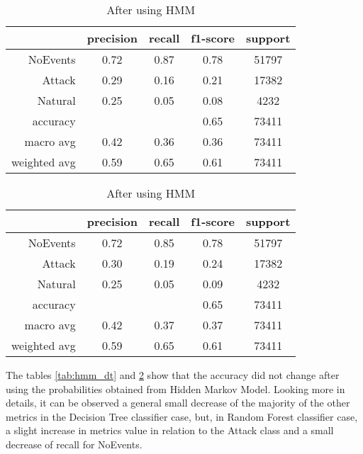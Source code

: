 \begin{table}[H]
    \centering \footnotesize
    \caption{Hidden Markov Model manipulation results for Random Forest classifier}  \label{tab:hmm_rf}
    \begin{subtable}[t]{.5\linewidth}
        \centering
        \caption{Before using HMM} 
        \begin{tabular}{rcccc}\toprule
            & precision    &recall & f1-score  & support \\\midrule
            NoEvents   &    0.72  &    0.87 &     0.78 &  51797 \\
            Attack     &  0.29    &  0.16   &   0.21   &  17382 \\
           Natural     &  0.25    &  0.05   &   0.08   &   4232 \\
          accuracy     &          &         &   0.65   &  73411 \\
         macro avg     &  0.42    &  0.36   &   0.36   &  73411 \\
      weighted avg     &  0.59    &  0.65   &   0.61   &  73411 \\ \bottomrule
        \end{tabular}
    \end{subtable}%
    \begin{subtable}[t]{.5\linewidth}
        \centering
        \caption{After using HMM}
        \begin{tabular}{rcccc}\toprule
        & precision &   recall & f1-score  & support \\\midrule
        NoEvents   &    0.72 &     0.85  &    0.78 &  51797\\
        Attack     &  0.30   &   0.19    &  0.24   &  17382\\
       Natural     &  0.25   &   0.05    &  0.09   &   4232\\
      accuracy     &         &           &  0.65   &  73411\\
     macro avg     &  0.42   &   0.37    &  0.37   &  73411\\
  weighted avg     &  0.59   &   0.65    &  0.61   &  73411\\ \bottomrule   
        \end{tabular}
    \end{subtable}
\end{table}

The tables \ref{tab:hmm_dt} and \ref{tab:hmm_rf} show that the accuracy did not change after using the probabilities obtained from Hidden Markov Model. Looking more in details, it can be observed a general small decrease of the majority of the other metrics in the Decision Tree classifier case, but, in Random Forest classifier case, a slight increase in metrics value in relation to the Attack class and a small decrease of recall for NoEvents.

